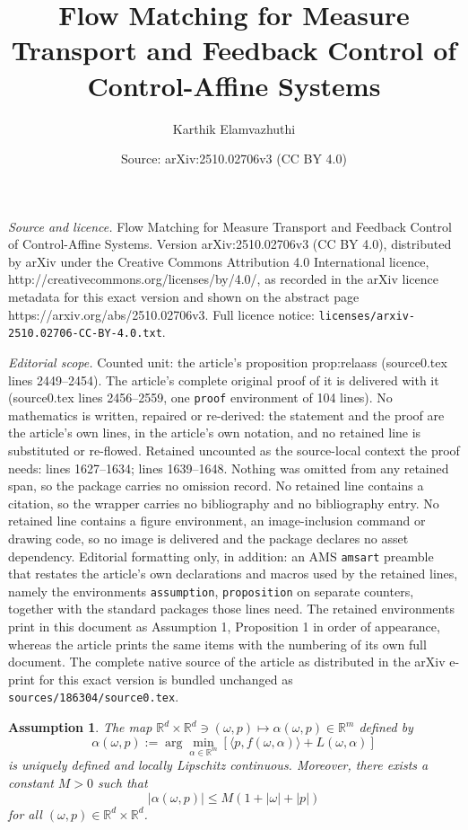 \documentclass[10pt,a4paper]{amsart}
\title{Flow Matching for Measure Transport and Feedback Control of Control-Affine Systems}
\author{Karthik Elamvazhuthi}
\date{Source: arXiv:2510.02706v3 (CC BY 4.0)}
\newtheorem{assumption}{Assumption}
\begin{document}
\maketitle

\noindent\emph{Source and licence.} Flow Matching for Measure Transport and Feedback Control of Control-Affine Systems. Version arXiv:2510.02706v3 (CC BY 4.0), distributed by arXiv under the Creative Commons Attribution 4.0 International licence, http://creativecommons.org/licenses/by/4.0/, as recorded in the arXiv licence metadata for this exact version and shown on the abstract page https://arxiv.org/abs/2510.02706v3. Full licence notice: \texttt{licenses/arxiv-2510.02706-CC-BY-4.0.txt}.\par\smallskip

\noindent\textit{Editorial scope.} Counted unit: the article's proposition prop:relaass (source0.tex lines 2449--2454). The article's complete original proof of it is delivered with it (source0.tex lines 2456--2559, one \texttt{proof} environment of 104 lines). No mathematics is written, repaired or re-derived: the statement and the proof are the article's own lines, in the article's own notation, and no retained line is substituted or re-flowed.  Retained uncounted as the source-local context the proof needs: lines 1627--1634; lines 1639--1648.  Nothing was omitted from any retained span, so the package carries no omission record.  No retained line contains a citation, so the wrapper carries no bibliography and no bibliography entry.  No retained line contains a figure environment, an image-inclusion command or drawing code, so no image is delivered and the package declares no asset dependency.  Editorial formatting only, in addition: an AMS \texttt{amsart} preamble that restates the article's own declarations and macros used by the retained lines, namely the environments \texttt{assumption}, \texttt{proposition} on separate counters, together with the standard packages those lines need.  The retained environments print in this document as Assumption 1, Proposition 1 in order of appearance, whereas the article prints the same items with the numbering of its own full document.  The complete native source of the article as distributed in the arXiv e-print for this exact version is bundled unchanged as \texttt{sources/186304/source0.tex}.
\begin{assumption}
\label{asmp:pmp-control}
The map $\mathbb{R}^d \times \mathbb{R}^d \ni (\omega, p) \mapsto \alpha(\omega,p) \in \mathbb{R}^m$ defined by
\[\alpha(\omega,p) := \arg\min_{\alpha \in \mathbb{R}^m} \left[\langle p, f(\omega,\alpha) \rangle + L(\omega,\alpha)\right]\]
is uniquely defined and locally Lipschitz continuous. Moreover, there exists a constant $M > 0$ such that 
\[|\alpha(\omega,p)| \leq M(1 + |\omega| + |p|)\]
for all $(\omega, p) \in \mathbb{R}^d \times \mathbb{R}^d$.
\end{assumption}
\end{document}
